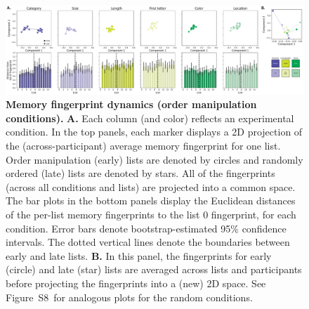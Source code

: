 \documentclass[11pt]{article}
\newcommand{\fingerprintTrajectoryRandom}{S8}
\begin{document}
\begin{figure}[tp] \centering
    \includegraphics[width=\textwidth]{figures/fingerprint_trajectories}
    
    \caption{\textbf{Memory fingerprint dynamics (order manipulation
    conditions).} \textbf{A.} Each column (and color) reflects an experimental
    condition. In the top panels, each marker displays a 2D projection of the
    (across-participant) average memory fingerprint for one list. Order
    manipulation (early) lists are denoted by circles and randomly ordered
    (late) lists are denoted by stars. All of the fingerprints (across all
    conditions and lists) are projected into a common space. The bar plots in
    the bottom panels display the Euclidean distances of the per-list memory
    fingerprints to the list 0 fingerprint, for each condition. Error bars
    denote bootstrap-estimated 95\% confidence intervals. The dotted vertical
    lines denote the boundaries between early and late lists. \textbf{B.} In
    this panel, the fingerprints for early (circle) and late (star) lists are
    averaged across lists and participants before projecting the fingerprints
    into a (new) 2D space. See Figure~\fingerprintTrajectoryRandom~for
    analogous plots for the random conditions. }
    \label{fig:fingerprint-trajectories}
    
    \end{figure}
\end{document}
